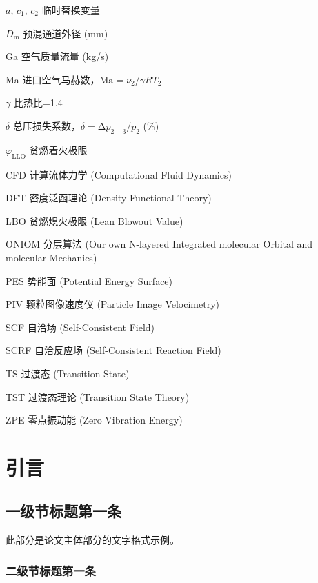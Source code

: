 \documentclass[degree=bachelor]{thuthesis}
\begin{document}
\tableofcontents

\listoffigures

\listoftables

\begin{denotation}[6.8em]
  \item[$a$, $c_1$, $c_2$] 临时替换变量
  \item[$D_{\text{m}}$] 预混通道外径 (mm)
  \item[Ga] 空气质量流量 (kg/s)
  \item[Ma] 进口空气马赫数，$\text{Ma} = \nu_2 / \gamma R T_2$
  \item[$\gamma$] 比热比=1.4
  \item[$\delta$] 总压损失系数，$\delta = \increment p_{2-3} / p_2$ (\%)
  \item[$\varphi_{\text{LLO}}$] 贫燃着火极限
  \item[CFD] 计算流体力学 (Computational Fluid Dynamics)
  \item[DFT] 密度泛函理论 (Density Functional Theory)
  \item[LBO] 贫燃熄火极限 (Lean Blowout Value)
  \item[ONIOM] 分层算法 (Our own N-layered Integrated molecular Orbital and molecular Mechanics)
  \item[PES] 势能面 (Potential Energy Surface)
  \item[PIV] 颗粒图像速度仪 (Particle Image Velocimetry)
  \item[SCF] 自洽场 (Self-Consistent Field)
  \item[SCRF] 自洽反应场 (Self-Consistent Reaction Field)
  \item[TS] 过渡态 (Transition State)
  \item[TST] 过渡态理论 (Transition State Theory)
  \item[ZPE] 零点振动能 (Zero Vibration Energy)
\end{denotation}


\mainmatter

\chapter{引言}

\section{一级节标题第一条}

此部分是论文主体部分的文字格式示例。

\subsection{二级节标题第一条}
\end{document}
